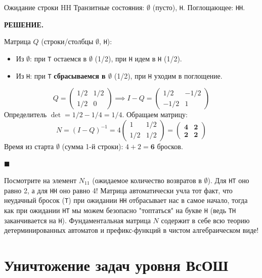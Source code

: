 \documentclass[12pt,a4paper]{article}
\newenvironment{solution}{
    \begin{tcolorbox}[
        enhanced, breakable, blanker,
        borderline west={2.5pt}{0pt}{solgray},
        left=12pt, top=5pt, bottom=5pt,
        before skip=10pt, after skip=15pt
    ]
    \textbf{\textsf{РЕШЕНИЕ.}}\;
}{
    \hfill $\blacksquare$
    \end{tcolorbox}
}
\begin{document}
\begin{problem}{Ожидание строки HH}{}
Транзитные состояния: $\emptyset$ (пусто), \texttt{H}. Поглощающее: \texttt{HH}.
\end{problem}
\begin{solution}
Матрица $Q$ (строки/столбцы $\emptyset$, \texttt{H}):
\begin{itemize}
    \item Из $\emptyset$: при \texttt{T} остаемся в $\emptyset$ (1/2), при \texttt{H} идем в \texttt{H} (1/2).
    \item Из \texttt{H}: при \texttt{T} \textbf{сбрасываемся в $\emptyset$} (1/2), при \texttt{H} уходим в поглощение.
\end{itemize}
\[ Q = \begin{pmatrix} 1/2 & 1/2 \\ 1/2 & 0 \end{pmatrix} \implies I - Q = \begin{pmatrix} 1/2 & -1/2 \\ -1/2 & 1 \end{pmatrix} \]
Определитель $\det = 1/2 - 1/4 = 1/4$. Обращаем матрицу:
\[ N = (I-Q)^{-1} = 4 \begin{pmatrix} 1 & 1/2 \\ 1/2 & 1/2 \end{pmatrix} = \mathbf{\begin{pmatrix} 4 & 2 \\ 2 & 2 \end{pmatrix}} \]
Время из старта $\emptyset$ (сумма 1-й строки): $4 + 2 = \mathbf{6}$ бросков.
\end{solution}

\begin{insight}
Посмотрите на элемент $N_{11}$ (ожидаемое количество возвратов в $\emptyset$). Для \texttt{HT} оно равно 2, а для \texttt{HH} оно равно 4! Матрица автоматически учла тот факт, что неудачный бросок (\texttt{T}) при ожидании \texttt{HH} отбрасывает нас в самое начало, тогда как при ожидании \texttt{HT} мы можем безопасно "топтаться" на букве \texttt{H} (ведь \texttt{TH} заканчивается на \texttt{H}). 
Фундаментальная матрица $N$ содержит в себе всю теорию детерминированных автоматов и префикс-функций в чистом алгебраическом виде!
\end{insight}


\newpage
\section{Уничтожение задач уровня ВсОШ}
\end{document}
